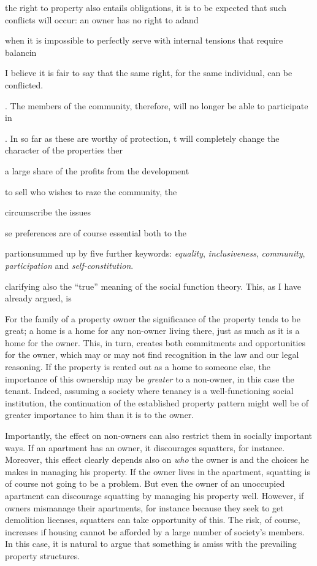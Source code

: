 the right to property also entails obligations, it is to be expected that such conflicts will occur: an owner has no right to adand


 when it is impossible to perfectly serve with internal tensions that require balancin


 I believe it is fair to say that the same right, for the same individual, can be conflicted. 







. The members of the community, therefore, will no longer be able to participate in 


. In so far as these are worthy of protection, t will completely change the character of the properties ther

a large share of the profits from the development

 to sell who wishes to raze the community, the 



circumscribe the issues 

se preferences are of course essential both to the 




partionsummed up by five further keywords: {\it equality}, {\it inclusiveness}, {\it community}, {\it participation} and {\it self-constitution}. 




clarifying also the ``true'' meaning of the social function theory. This, as I have already argued, is 





For the family of a property owner the significance of the property tends to be great; a home is a home for any non-owner living there, just as much as it is a home for the owner.  This, in turn, creates both commitments and opportunities for the owner, which may or may not find recognition in the law and our legal reasoning. If the property is rented out as a home to someone else, the importance of this ownership may be {\it greater} to a non-owner, in this case the tenant. Indeed, assuming a society where tenancy is a well-functioning social institution, the continuation of the established property pattern might well be of greater importance to him than it is to the owner.



Importantly, the effect on non-owners can also restrict them in socially important ways. If an apartment has an owner, it discourages squatters, for instance. Moreover, this effect clearly depends also on {\it who} the owner is and the choices he makes in managing his property. If the owner lives in the apartment, squatting is of course not going to be a problem. But even the owner of an unoccupied apartment can discourage squatting by managing his property well. However, if owners mismanage their apartments, for instance because they seek to get demolition licenses, squatters can take opportunity of this. The risk, of course, increases if housing cannot be afforded by a large number of society's members. In this case, it is natural to argue that something is amiss with the prevailing property structures. 

